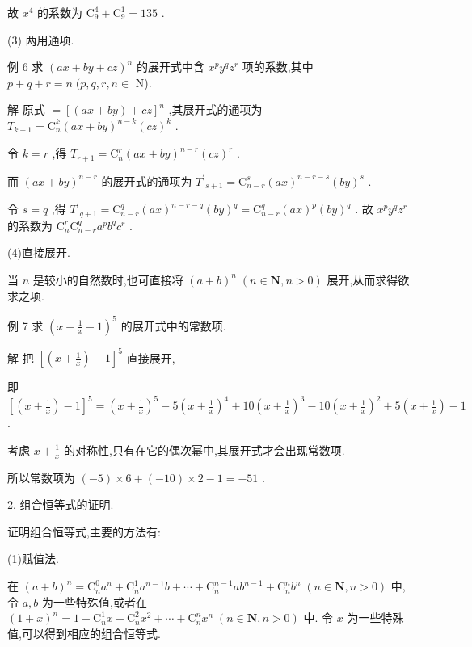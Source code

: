 \documentclass[10pt]{article}
\begin{document}
故 \({x}^{4}\) 的系数为 \({\mathrm{C}}_{9}^{4} + {\mathrm{C}}_{9}^{1} = {135}\) .

(3) 两用通项.

例 6 求 \({\left( ax + by + cz\right) }^{n}\) 的展开式中含 \({x}^{p}{y}^{q}{z}^{r}\) 项的系数,其中 \(p + q + r = n\;(p,q,r,n \in\) N).

解 原式 \(= {\left\lbrack  \left( ax + by\right)  + cz\right\rbrack  }^{n}\) ,其展开式的通项为 \({T}_{k + 1} = {\mathrm{C}}_{n}^{k}{\left( ax + by\right) }^{n - k}{\left( cz\right) }^{k}\) .

令 \(k = r\) ,得 \({T}_{r + 1} = {\mathrm{C}}_{n}^{r}{\left( ax + by\right) }^{n - r}{\left( cz\right) }^{r}\) .

而 \({\left( ax + by\right) }^{n - r}\) 的展开式的通项为 \({T}^{\prime }{}_{s + 1} = {\mathrm{C}}_{n - r}^{s}{\left( ax\right) }^{n - r - s}{\left( by\right) }^{s}\) .

令 \(s = q\) ,得 \({T}^{\prime }{}_{q + 1} = {\mathrm{C}}_{n - r}^{q}{\left( ax\right) }^{n - r - q}{\left( by\right) }^{q} = {\mathrm{C}}_{n - r}^{q}{\left( ax\right) }^{p}{\left( by\right) }^{q}\) . 故 \({x}^{p}{y}^{q}{z}^{r}\) 的系数为 \({\mathrm{C}}_{n}^{r}{\mathrm{C}}_{n - r}^{q}{a}^{p}{b}^{q}{c}^{r}\) .

(4)直接展开.

当 \(n\) 是较小的自然数时,也可直接将 \({\left( a + b\right) }^{n}\;\left( {n \in  \mathbf{N},n > 0}\right)\) 展开,从而求得欲求之项.

例 7 求 \({\left( x + \frac{1}{x} - 1\right) }^{5}\) 的展开式中的常数项.

解 把 \({\left\lbrack  \left( x + \frac{1}{x}\right)  - 1\right\rbrack  }^{5}\) 直接展开,

即 \({\left\lbrack  \left( x + \frac{1}{x}\right)  - 1\right\rbrack  }^{5} = {\left( x + \frac{1}{x}\right) }^{5} - 5{\left( x + \frac{1}{x}\right) }^{4} + {10}{\left( x + \frac{1}{x}\right) }^{3} - {10}{\left( x + \frac{1}{x}\right) }^{2} + 5\left( {x + \frac{1}{x}}\right)  - 1\) .

考虑 \(x + \frac{1}{x}\) 的对称性,只有在它的偶次幂中,其展开式才会出现常数项.

所以常数项为 \(\left( {-5}\right)  \times  6 + \left( {-{10}}\right)  \times  2 - 1 =  - {51}\) .

2. 组合恒等式的证明.

证明组合恒等式,主要的方法有:

(1)赋值法.

在 \({\left( a + b\right) }^{n} = {\mathrm{C}}_{n}^{0}{a}^{n} + {\mathrm{C}}_{n}^{1}{a}^{n - 1}b + \cdots  + {\mathrm{C}}_{n}^{n - 1}a{b}^{n - 1} + {\mathrm{C}}_{n}^{n}{b}^{n}\;\left( {n \in  \mathbf{N},n > 0}\right)\) 中,令 \(a,b\) 为一些特殊值,或者在 \({\left( 1 + x\right) }^{n} = 1 + {\mathrm{C}}_{n}^{1}x + {\mathrm{C}}_{n}^{2}{x}^{2} + \cdots  + {\mathrm{C}}_{n}^{n}{x}^{n}\;\left( {n \in  \mathbf{N},n > 0}\right)\) 中. 令 \(x\) 为一些特殊值,可以得到相应的组合恒等式.
\end{document}
